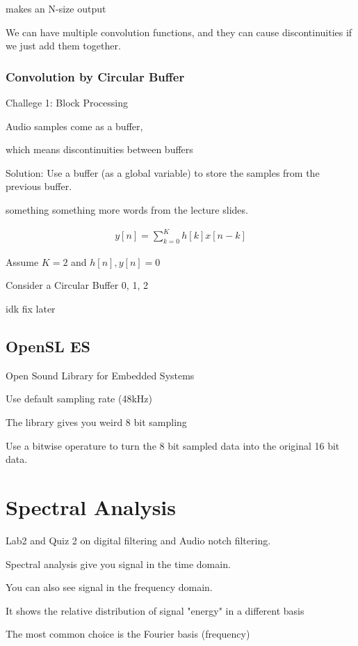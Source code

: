 \documentclass[fleqn]{report}
\newcommand{\equations} [1] {
\begin{gather*}
#1
\end{gather*}
}
\begin{document}
makes an N-size output 

We can have multiple convolution functions, and they can cause discontinuities 
if we just add them together.

\subsection{Convolution by Circular Buffer}
Challege 1: Block Processing

Audio samples come as a buffer, 

which means discontinuities between buffers 

Solution: Use a buffer (as a global variable) to store the samples 
from the previous buffer. 

something something more words from the lecture slides.

\equations{
    y[n]
    =
    \sum^K_{k=0} h[k]x[n-k] 
}

Assume $K=2$ and $h[n], y[n] = 0$

Consider a Circular Buffer 0, 1, 2

idk fix later 

\section{OpenSL ES}
Open Sound Library for Embedded Systems

Use default sampling rate (48kHz)

The library gives you weird 8 bit sampling 

Use a bitwise operature to turn the 8 bit sampled data into 
the original 16 bit data.

\chapter{Spectral Analysis}
Lab2 and Quiz 2 on digital filtering and Audio notch filtering.

Spectral analysis give you signal in the time domain. 

You can also see signal in the frequency domain. 

It shows the relative distribution of signal "energy" in a different basis 

The most common choice is the Fourier basis (frequency)
\end{document}
